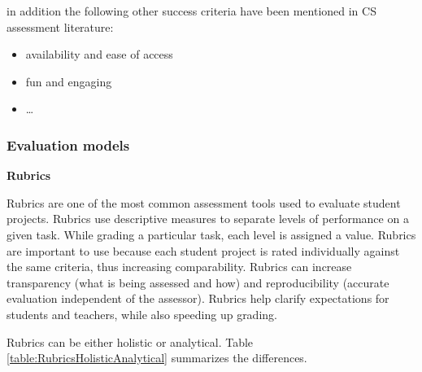 in addition the following other success criteria have been mentioned in CS assessment literature:
\begin{itemize}
\item availability and ease of access \cite{Yadav2015}
\item fun and engaging 
\item \ldots {}
\end{itemize}

%


\subsubsection*{Evaluation models}\label{sec:evaluationModels}
\noindent \textbf{Rubrics}


Rubrics are one of the most common assessment tools used to evaluate student projects. Rubrics use descriptive measures to separate levels of performance on a given task. While grading a particular task, each level is assigned a value. Rubrics are important to use because each student project is rated individually against the same criteria, thus increasing comparability. Rubrics can increase transparency (what is being assessed and how) and reproducibility (accurate evaluation independent of the assessor). Rubrics help clarify expectations for students and teachers, while also speeding up grading\cite{catete2017framework}.



Rubrics can be either holistic or analytical. Table \ref{table:RubricsHolisticAnalytical} summarizes the differences.

